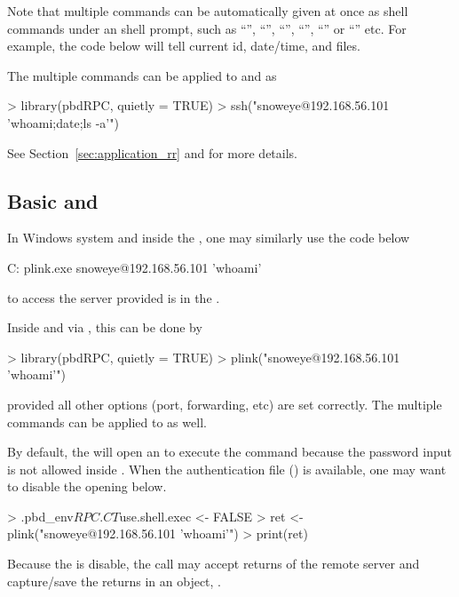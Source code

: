 Note that multiple commands can be automatically given at once
as shell commands under an shell prompt, such as ``\code{;}'', ``\code{\&\&}'',
``\code{>}'', ``\code{<}'', ``\code{|}'' or ``\code{\&}'' etc.
For example, the code below will tell current id, date/time, and files.
The multiple commands can be applied to  and  as
\begin{Code}[title=Multipel commands to \code{ssh()} in \pkg{pbdRPC} and \proglang{R}]
> library(pbdRPC, quietly = TRUE)
> ssh("snoweye@192.168.56.101 'whoami;date;ls -a'")
\end{Code}
See Section~\ref{sec:application_rr} and  for
more details.


\subsection[Basic \code{plink.exe} and \code{plink()}]{Basic  and }
\label{sec:basic_plink}

In Windows system and inside the , one may similarly use
the code below
\begin{Command}[title=Basic \code{plink.exe} in \code{cmd.exe}]
C:\> plink.exe snoweye@192.168.56.101 'whoami'
\end{Command}
to access the server provided  is in the .

Inside  and via , this can be done by
\begin{Code}[title=Basic \code{plink()} in \pkg{pbdRPC} and \proglang{R}]
> library(pbdRPC, quietly = TRUE)
> plink("snoweye@192.168.56.101 'whoami'")
\end{Code}
provided all other options (port, forwarding, etc) are set correctly.
The multiple commands can be applied to  as well.

By default,
the  will open an  to execute the
command  because the password input is not allowed inside
.
When the authentication file () is available,
one may want to disable the opening  below.
\begin{Code}[title=Advance \code{plink()} in \pkg{pbdRPC} and \proglang{R}]
> .pbd_env$RPC.CT$use.shell.exec <- FALSE
> ret <- plink("snoweye@192.168.56.101 'whoami'")
> print(ret)
\end{Code}
Because the  is disable, the  call
may accept returns of the remote server and capture/save the returns
in an  object, .

